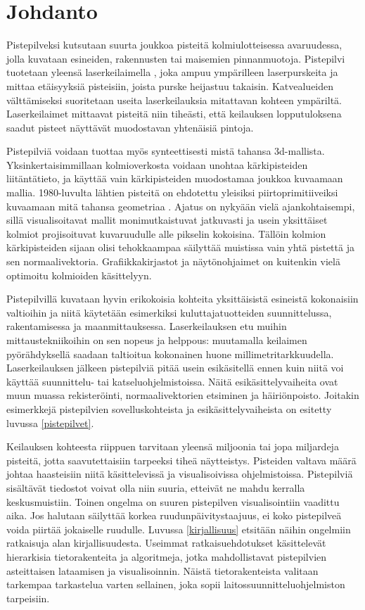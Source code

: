 \section{Johdanto}

Pistepilveksi kutsutaan suurta joukkoa pisteitä kolmiulotteisessa avaruudessa, jolla kuvataan esineiden, rakennusten tai maisemien pinnanmuotoja. Pistepilvi tuotetaan yleensä laserkeilaimella , joka ampuu ympärilleen laserpurskeita ja mittaa etäisyyksiä pisteisiin, joista purske heijastuu takaisin. Katvealueiden välttämiseksi suoritetaan useita laserkeilauksia mitattavan kohteen ympäriltä. Laserkeilaimet mittaavat pisteitä niin tiheästi, että keilauksen lopputuloksena saadut pisteet näyttävät muodostavan yhtenäisiä pintoja. 

Pistepilviä voidaan tuottaa myös synteettisesti mistä tahansa 3d-mallista. Yksinkertaisimmillaan kolmioverkosta voidaan unohtaa kärkipisteiden liitäntätieto, ja käyttää vain kärkipisteiden muodostamaa joukkoa kuvaamaan mallia. 1980-luvulta lähtien pisteitä on ehdotettu yleisiksi piirtoprimitiiveiksi kuvaamaan mitä tahansa geometriaa \cite{Whitted}. Ajatus on nykyään vielä ajankohtaisempi, sillä visualisoitavat mallit monimutkaistuvat jatkuvasti ja usein yksittäiset kolmiot projisoituvat kuvaruudulle alle pikselin kokoisina. Tällöin kolmion kärkipisteiden sijaan olisi tehokkaampaa säilyttää muistissa vain yhtä pistettä ja sen normaalivektoria. Grafiikkakirjastot ja näytönohjaimet on kuitenkin vielä optimoitu kolmioiden käsittelyyn.

Pistepilvillä kuvataan hyvin erikokoisia kohteita yksittäisistä esineistä kokonaisiin valtioihin ja niitä käytetään esimerkiksi kuluttajatuotteiden suunnittelussa, rakentamisessa ja maanmittauksessa. Laserkeilauksen etu muihin mittaustekniikoihin on sen nopeus ja helppous: muutamalla keilaimen pyörähdyksellä saadaan taltioitua kokonainen huone millimetritarkkuudella. Laserkeilauksen jälkeen pistepilviä pitää usein esikäsitellä ennen kuin niitä voi käyttää suunnittelu- tai katseluohjelmistoissa. Näitä esikäsittelyvaiheita ovat muun muassa rekisteröinti, normaalivektorien etsiminen ja häiriönpoisto. Joitakin esimerkkejä pistepilvien sovelluskohteista ja esikäsittelyvaiheista on esitetty luvussa \ref{pistepilvet}.

Keilauksen kohteesta riippuen tarvitaan yleensä miljoonia tai jopa miljardeja pisteitä, jotta saavutettaisiin tarpeeksi tiheä näytteistys. Pisteiden valtava määrä johtaa haasteisiin niitä käsittelevissä ja visualisoivissa ohjelmistoissa. Pistepilviä sisältävät tiedostot voivat olla niin suuria, etteivät ne mahdu kerralla keskusmuistiin. Toinen ongelma on suuren pistepilven visualisointiin vaadittu aika. Jos halutaan säilyttää korkea ruudunpäivitystaajuus, ei koko pistepilveä voida piirtää jokaiselle ruudulle. Luvussa \ref{kirjallisuus} etsitään näihin ongelmiin ratkaisuja alan kirjallisuudesta. Useimmat ratkaisuehdotukset käsittelevät hierarkisia tietorakenteita ja algoritmeja, jotka mahdollistavat pistepilvien asteittaisen lataamisen ja visualisoinnin. Näistä tietorakenteista valitaan tarkempaa tarkastelua varten sellainen, joka sopii laitossuunnitteluohjelmiston tarpeisiin. 

